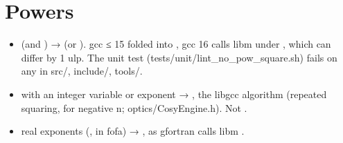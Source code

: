 \section{\texorpdfstring{Powers}{Powers}}\label{translation_report-04u5fnumerics:43-powers}
\begin{itemize}
\item {} (and ) →  (or ). gcc ≤ 15 folded  into , gcc 16 calls libm 
under , which can differ by 1 ulp. The unit test  (tests/\allowbreak{}unit/\allowbreak{}lint\_\allowbreak{}no\_\allowbreak{}pow\_\allowbreak{}square.\allowbreak{}sh)
fails on any  in src/, include/, tools/.
\item {} with an integer variable or  exponent → , the libgcc  algorithm
(repeated squaring,  for negative n; optics/\allowbreak{}CosyEngine.\allowbreak{}h). Not .
\item real exponents (,  in fofa) → , as gfortran calls libm .
\end{itemize}
